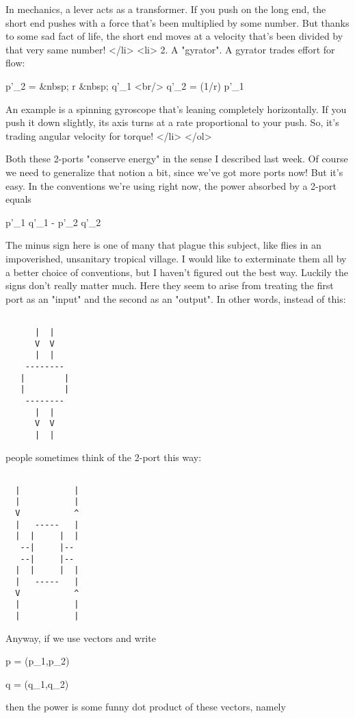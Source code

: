   In mechanics, a lever acts as a transformer.  If you push on the 
  long end, the short end pushes with a force that's been multiplied
  by some number.  But thanks to some sad fact of life, the short end
  moves at a velocity that's been divided by that very same number!
</li>
<li>
  2. A "gyrator".  A gyrator trades effort for flow:

  p'_{2} =  &nbsp; r &nbsp;  q'_{1} <br/>
  q'_{2} = (1/r) p'_{1}

  An example is a spinning gyroscope that's leaning completely 
  horizontally.  If you push it down slightly, its axis turns 
  at a rate proportional to your push.  So, it's trading angular
  velocity for torque!
</li>
</ol>

Both these 2-ports "conserve energy" in the sense I described last
week.  Of course we need to generalize that notion a bit, since we've 
got more ports now!  But it's easy.  In the conventions we're using
right now, the power absorbed by a 2-port equals

p'_{1} q'_{1} - p'_{2} q'_{2}

The minus sign here is one of many that plague this subject, like
flies in an impoverished, unsanitary tropical village.  I would like
to exterminate them all by a better choice of conventions, but I
haven't figured out the best way.  Luckily the signs don't really
matter much.  Here they seem to arise from treating the first port as
an "input" and the second as an "output".  
In other words, instead of this:


\begin{verbatim}

      |  |
      V  V
      |  |
    --------
   |        |
   |        |
    --------
      |  |
      V  V
      |  |
\end{verbatim}
    

people sometimes think of the 2-port this way:


\begin{verbatim}

  |           |
  |           |
  V           ^
  |   -----   |
  |  |     |  |
   --|     |--
   --|     |--
  |  |     |  |
  |   -----   |
  V           ^
  |           |
  |           |
\end{verbatim}
    

Anyway, if we use vectors and write 

p = (p_{1},p_{2})

q = (q_{1},q_{2})

then the power is some funny dot product of these vectors, namely

